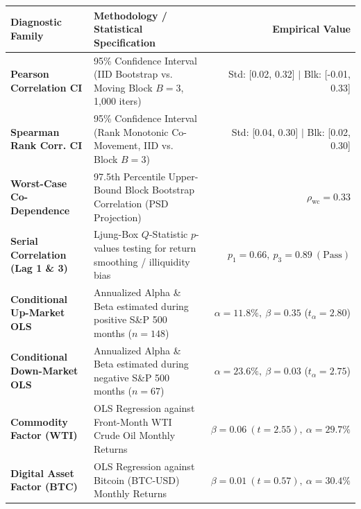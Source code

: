 \documentclass[10pt,a4paper]{article}
\begin{document}
\vspace{0.45em}

\begin{tcolorbox}[colback=white, colframe=primary, title=\textbf{\small\strut Appendix A: Extended Statistical, Bootstrap \& Factor Diagnostics}, fonttitle=\sffamily\bfseries\small, arc=5pt, boxrule=0.8pt, toptitle=4pt, bottomtitle=4pt, left=6pt, right=6pt, top=3.5pt, bottom=3.5pt, colbacktitle=primary]
\renewcommand{\arraystretch}{1.22}
\scriptsize
\begin{tabularx}{\textwidth}{l X r}
\toprule
\textbf{\textcolor{primary}{Diagnostic Family}} & \textbf{\textcolor{primary}{Methodology / Statistical Specification}} & \textbf{\textcolor{primary}{Empirical Value}} \\
\midrule
\textbf{Pearson Correlation CI} & 95\% Confidence Interval (IID Bootstrap vs. Moving Block $B=3$, 1,000 iters) & Std: [0.02, 0.32] $\vert$ Blk: [-0.01, 0.33] \\
\rowcolor{cardbg} \textbf{Spearman Rank Corr. CI} & 95\% Confidence Interval (Rank Monotonic Co-Movement, IID vs. Block $B=3$) & Std: [0.04, 0.30] $\vert$ Blk: [0.02, 0.30] \\
\textbf{Worst-Case Co-Dependence} & 97.5th Percentile Upper-Bound Block Bootstrap Correlation (PSD Projection) & $\rho_{\text{wc}} = 0.33$ \\
\rowcolor{cardbg} \textbf{Serial Correlation (Lag 1 \& 3)} & Ljung-Box $Q$-Statistic $p$-values testing for return smoothing / illiquidity bias & $p_1=0.66,\ p_3=0.89\ (\text{Pass})$ \\
\textbf{Conditional Up-Market OLS} & Annualized Alpha \& Beta estimated during positive S\&P 500 months ($n=148$) & $\alpha=11.8\%,\ \beta=0.35$ ($t_\alpha=2.80$) \\
\rowcolor{cardbg} \textbf{Conditional Down-Market OLS} & Annualized Alpha \& Beta estimated during negative S\&P 500 months ($n=67$) & $\alpha=23.6\%,\ \beta=0.03$ ($t_\alpha=2.75$) \\
\textbf{Commodity Factor (WTI)} & OLS Regression against Front-Month WTI Crude Oil Monthly Returns & $\beta=0.06\ (t=2.55),\ \alpha=29.7\%$ \\
\rowcolor{cardbg} \textbf{Digital Asset Factor (BTC)} & OLS Regression against Bitcoin (BTC-USD) Monthly Returns & $\beta=0.01\ (t=0.57),\ \alpha=30.4\%$ \\
\bottomrule
\end{tabularx}
\end{tcolorbox}
\end{document}
